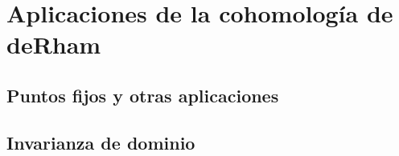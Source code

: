 \documentclass[CV.tex]{subfiles}
\begin{document}

\chapter{Aplicaciones de la cohomología de deRham}

\section{Puntos fijos y otras aplicaciones}


\section{Invarianza de dominio}
\end{document}
